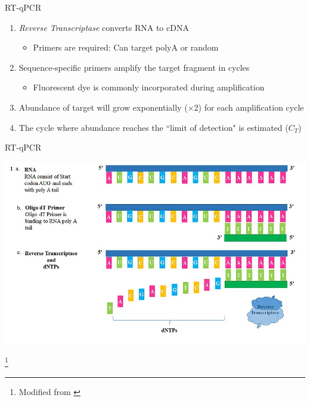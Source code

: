 \documentclass[aspectratio=169,11pt]{beamer}
\newcommand\blfootnote[1]{%
  \begingroup
  \renewcommand\thefootnote{}\footnote{#1}%
  \addtocounter{footnote}{-1}%
  \endgroup
}
\begin{document}
\begin{frame}{RT-qPCR}

	\begin{enumerate}
		\item \textit{Reverse Transcriptase} converts RNA to cDNA
		\begin{itemize}
			\item Primers are required: Can target polyA or random
		\end{itemize}
		\item Sequence-specific primers amplify the target fragment in cycles
		\begin{itemize}
			\item Fluorescent dye is commonly incorporated during amplification
		\end{itemize}
		\item Abundance of target will grow exponentially ($\times 2$) for each amplification cycle
		\item The cycle where abundance reaches the ``limit of detection" is estimated ($C_T$)
	\end{enumerate}

\end{frame}

\begin{frame}{RT-qPCR}

	\begin{center}
	\includegraphics[scale=0.3]{figures/RTqPCR1.png} 
	\end{center}
	
	\blfootnote{Modified from \cite{By Lokeshthimmana - Own work, CC BY-SA 4.0, https://commons.wikimedia.org/w/index.php?curid=76313637}}	

\end{frame}
\end{document}
